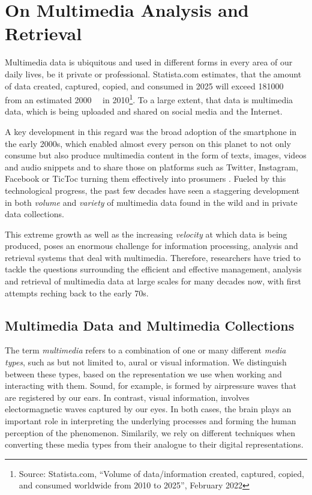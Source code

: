 \chapter{On Multimedia Analysis and Retrieval}
\label{chapter:theory_multimedia_analysis_and_retrieval}

Multimedia data is ubiquitous and used in different forms in every area of our daily lives, be it private or professional. Statista.com estimates, that the amount of data created, captured, copied, and consumed in 2025 will exceed \SI{181000}{\exa\byte} from an estimated \SI{2000}{\exa\byte} in 2010\footnote{Source: Statista.com, ``Volume of data/information created, captured, copied, and consumed worldwide from 2010 to 2025'', February 2022}. To a large extent, that data is multimedia data, which is being uploaded and shared on social media and the Internet.

A key development in this regard was the broad adoption of the smartphone in the early 2000s, which enabled almost every person on this planet to not only consume but also produce multimedia content in the form of texts, images, videos and audio snippets and to share those on platforms such as Twitter, Instagram, Facebook or TicToc turning them effectively into prosumers \cite{Ritzer:2010Production,Ritzer2012:Coming}. Fueled by this technological progress, the past few decades have seen a staggering development in both \emph{volume} and \emph{variety} of multimedia data found in the wild and in private data collections.

This extreme growth as well as the increasing \emph{velocity} at which data is being produced, poses an enormous challenge for information processing, analysis and retrieval systems that deal with multimedia. Therefore, researchers have tried to tackle the questions surrounding the efficient and effective management, analysis and retrieval of multimedia data at large scales for many decades now, with first attempts reching back to the early 70s.

\section{Multimedia Data and Multimedia Collections}
\label{section:multmedia_data}

The term \emph{multimedia} refers to a combination of one or many different \emph{media types}, such as but not limited to, aural or visual information. We distinguish between these types, based on the representation we use when working and interacting with them. Sound, for example, is formed by airpressure waves that are registered by our ears. In contrast, visual information, involves electormagnetic waves captured by our eyes. In both cases, the brain plays an important role in interpreting the underlying processes and forming the human perception of the phenomenon. Similarily, we rely on different techniques when converting these media types from their analogue to their digital representations. 

